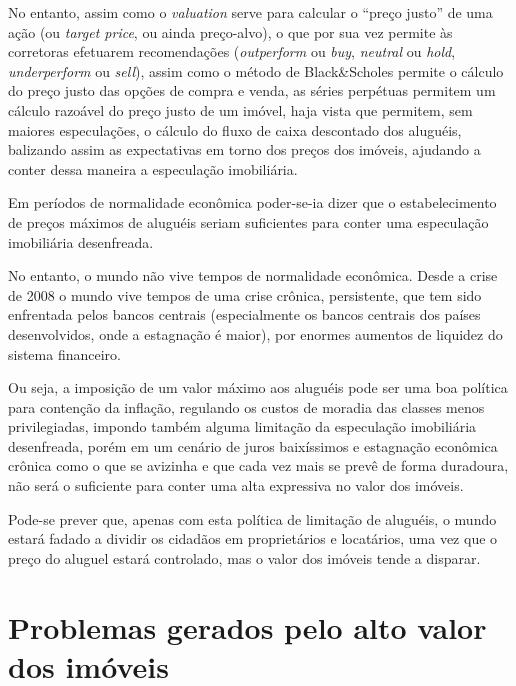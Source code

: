 \documentclass[
	12pt,				%
	oneside,			%
	a4paper,			%
	chapter=TITLE,		%
	section=TITLE,		%
	english,			%
	brazil				%
	]{abntex2}
\begin{document}
No entanto, assim como o \emph{valuation} serve para calcular o ``preço justo'' de uma
ação (ou \emph{target price}, ou ainda preço-alvo), o que por sua vez permite às
corretoras efetuarem recomendações (\emph{outperform} ou \emph{buy}, \emph{neutral} ou \emph{hold},
\emph{underperform} ou \emph{sell}), assim como o método de Black\&Scholes permite o
cálculo do preço justo das opções de compra e venda, as séries perpétuas
permitem um cálculo razoável do preço justo de um imóvel, haja vista que
permitem, sem maiores especulações, o cálculo do fluxo de caixa descontado dos
aluguéis, balizando assim as expectativas em torno dos preços dos imóveis,
ajudando a conter dessa maneira a especulação imobiliária.

Em períodos de normalidade econômica poder-se-ia dizer que o estabelecimento
de preços máximos de aluguéis seriam suficientes para conter uma especulação
imobiliária desenfreada.

No entanto, o mundo não vive tempos de normalidade econômica. Desde a crise de
2008 o mundo vive tempos de uma crise crônica, persistente, que tem sido
enfrentada pelos bancos centrais (especialmente os bancos centrais dos países
desenvolvidos, onde a estagnação é maior), por enormes aumentos de liquidez
do sistema financeiro.

Ou seja, a imposição de um valor máximo aos aluguéis pode ser uma boa política
para contenção da inflação, regulando os custos de moradia das classes menos
privilegiadas, impondo também alguma limitação da especulação imobiliária
desenfreada, porém em um cenário de juros baixíssimos e estagnação econômica
crônica como o que se avizinha e que cada vez mais se prevê de forma duradoura,
não será o suficiente para conter uma alta expressiva no valor dos imóveis.

Pode-se prever que, apenas com esta política de limitação de aluguéis, o mundo
estará fadado a dividir os cidadãos em proprietários e locatários, uma vez que o
preço do aluguel estará controlado, mas o valor dos imóveis tende a disparar.

\hypertarget{problemas-gerados-pelo-alto-valor-dos-imuxf3veis}{%
\section{Problemas gerados pelo alto valor dos imóveis}\label{problemas-gerados-pelo-alto-valor-dos-imuxf3veis}}
\end{document}
